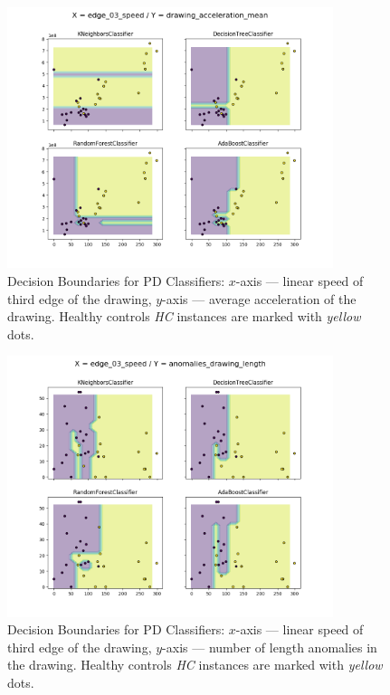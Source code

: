 \begin{figure}[htb]
  \centering
    \includegraphics[width=0.85\textwidth, trim=0cm 1.5cm 0cm 0cm]
        {images/classifier/003}
    \caption{Decision Boundaries for PD Classifiers: $x$-axis --- linear speed of third edge of the drawing, $y$-axis --- average acceleration of the drawing. Healthy controls \textit{HC} instances are marked with \textit{yellow} dots.}
    
    \label{classifier2}
\end{figure}

\begin{figure}[htb]
  \centering
    \includegraphics[width=0.85\textwidth, trim=0cm 1.5cm 0cm 0cm]
        {images/classifier/002}
    \caption{Decision Boundaries for PD Classifiers: $x$-axis --- linear speed of third edge of the drawing, $y$-axis --- number of length anomalies in the drawing. Healthy controls \textit{HC} instances are marked with \textit{yellow} dots.}
    
    \label{classifier3}
\end{figure}

